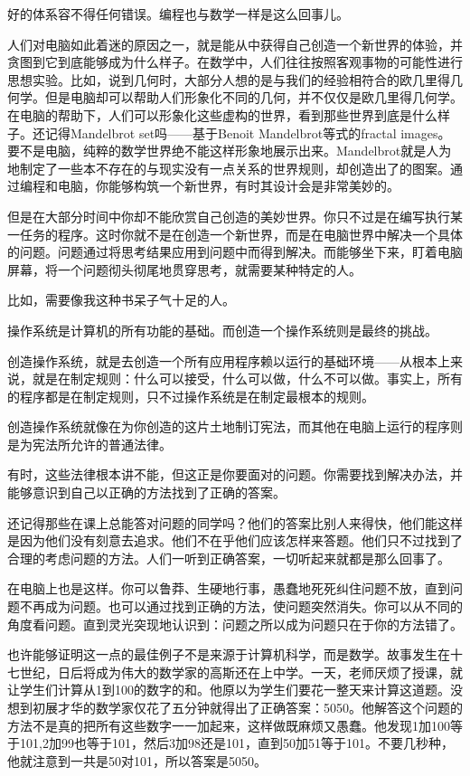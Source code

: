 好的体系容不得任何错误。编程也与数学一样是这么回事儿。

 

人们对电脑如此着迷的原因之一，就是能从中获得自己创造一个新世界的体验，并贪图到它到底能够成为什么样子。在数学中，人们往往按照客观事物的可能性进行思想实验。比如，说到几何时，大部分人想的是与我们的经验相符合的欧几里得几何学。但是电脑却可以帮助人们形象化不同的几何，并不仅仅是欧几里得几何学。在电脑的帮助下，人们可以形象化这些虚构的世界，看到那些世界到底是什么样子。还记得Mandelbrot set吗——基于Benoit Mandelbrot等式的fractal images。要不是电脑，纯粹的数学世界绝不能这样形象地展示出来。Mandelbrot就是人为地制定了一些本不存在的与现实没有一点关系的世界规则，却创造出了的图案。通过编程和电脑，你能够构筑一个新世界，有时其设计会是非常美妙的。

但是在大部分时间中你却不能欣赏自己创造的美妙世界。你只不过是在编写执行某一任务的程序。这时你就不是在创造一个新世界，而是在电脑世界中解决一个具体的问题。问题通过将思考结果应用到问题中而得到解决。而能够坐下来，盯着电脑屏幕，将一个问题彻头彻尾地贯穿思考，就需要某种特定的人。

比如，需要像我这种书呆子气十足的人。

 

操作系统是计算机的所有功能的基础。而创造一个操作系统则是最终的挑战。

创造操作系统，就是去创造一个所有应用程序赖以运行的基础环境——从根本上来说，就是在制定规则：什么可以接受，什么可以做，什么不可以做。事实上，所有的程序都是在制定规则，只不过操作系统是在制定最根本的规则。

创造操作系统就像在为你创造的这片土地制订宪法，而其他在电脑上运行的程序则是为宪法所允许的普通法律。

有时，这些法律根本讲不能，但这正是你要面对的问题。你需要找到解决办法，并能够意识到自己以正确的方法找到了正确的答案。

还记得那些在课上总能答对问题的同学吗？他们的答案比别人来得快，他们能这样是因为他们没有刻意去追求。他们不在乎他们应该怎样来答题。他们只不过找到了合理的考虑问题的方法。人们一听到正确答案，一切听起来就都是那么回事了。

 

在电脑上也是这样。你可以鲁莽、生硬地行事，愚蠢地死死纠住问题不放，直到问题不再成为问题。也可以通过找到正确的方法，使问题突然消失。你可以从不同的角度看问题。直到灵光突现地认识到：问题之所以成为问题只在于你的方法错了。

也许能够证明这一点的最佳例子不是来源于计算机科学，而是数学。故事发生在十七世纪，日后将成为伟大的数学家的高斯还在上中学。一天，老师厌烦了授课，就让学生们计算从1到100的数字的和。他原以为学生们要花一整天来计算这道题。没想到初展才华的数学家仅花了五分钟就得出了正确答案：5050。他解答这个问题的方法不是真的把所有这些数字一一加起来，这样做既麻烦又愚蠢。他发现1加100等于101,2加99也等于101，然后3加98还是101，直到50加51等于101。不要几秒种，他就注意到一共是50对101，所以答案是5050。

